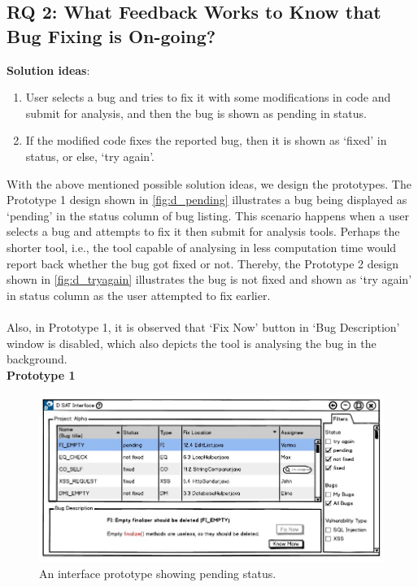 \subsection{RQ 2: What Feedback Works to Know that Bug Fixing is On-going?}

\textbf{Solution ideas}: \\
\begin{enumerate}
\item  User selects a bug and tries to fix it with some modifications in code and submit for analysis, and then the bug is shown as pending in status.
\item  If the modified code fixes the reported bug, then it is shown as ‘fixed’ in status, or else, ‘try again’.
\end{enumerate}

With the above mentioned possible solution ideas, we design the prototypes. The Prototype 1 design shown in \autoref{fig:d_pending} illustrates a bug being displayed as ‘pending’ in the status column of bug listing. This scenario happens when a user selects a bug and attempts to fix it then submit for analysis tools. Perhaps the shorter tool, i.e., the tool capable of analysing in less computation time would report back whether the bug got fixed or not. Thereby, the Prototype 2 design shown in \autoref{fig:d_tryagain} illustrates the bug is not fixed and shown as ‘try again’ in status column as the user attempted to fix earlier. \\ \\

Also, in Prototype 1, it is observed that ‘Fix Now’ button in ‘Bug Description’ window is disabled, which also depicts the tool is analysing the bug in the background. \\

\textbf{Prototype 1}

\begin{figure}[hbt!]
	\centering
	\includegraphics[width=\linewidth]{figures/d_pending}
	\caption{An interface prototype showing pending status.}
	\label{fig:d_pending}
\end{figure}

